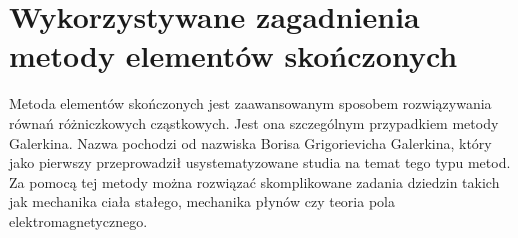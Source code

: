
\chapter{Wykorzystywane zagadnienia metody elementów skończonych}
\label{cha:MES_chapter}

Metoda elementów skończonych jest zaawansowanym sposobem rozwiązywania równań różniczkowych cząstkowych. Jest ona szczególnym przypadkiem metody Galerkina. Nazwa pochodzi od nazwiska Borisa Grigorievicha Galerkina, który jako pierwszy przeprowadził usystematyzowane studia na temat tego typu metod. Za pomocą tej metody można rozwiązać skomplikowane zadania dziedzin takich jak mechanika ciała stałego, mechanika płynów czy teoria pola elektromagnetycznego.  




































